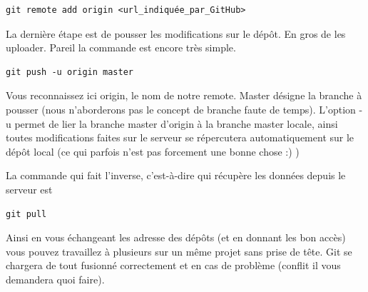 \documentclass[a4paper]{article}
\begin{document}
\begin{verbatim}
git remote add origin <url_indiquée_par_GitHub>
\end{verbatim}

La dernière étape est de pousser les modifications sur le dépôt. En gros de les uploader. Pareil la commande est encore très simple.

\begin{verbatim}
git push -u origin master
\end{verbatim}

Vous reconnaissez ici origin, le nom de notre remote. Master désigne la branche à pousser (nous n'aborderons pas le concept de branche faute de temps). L'option -u permet de lier la branche master d'origin à la branche master locale, ainsi toutes modifications faites sur le serveur se répercutera automatiquement sur le dépôt local (ce qui parfois n'est pas forcement une bonne chose :) )

La commande qui fait l'inverse, c'est-à-dire qui récupère les données depuis le serveur est
\begin{verbatim}
git pull
\end{verbatim}

Ainsi en vous échangeant les adresse des dépôts (et en donnant les bon accès) vous pouvez travaillez à plusieurs sur un même projet sans prise de tête. Git se chargera de tout fusionné correctement et en cas de problème (conflit il vous demandera quoi faire).
\end{document}

